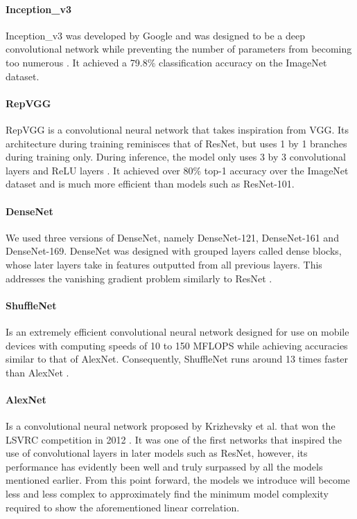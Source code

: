 \documentclass{article}
\begin{document}
\paragraph{Inception\_v3} Inception\_v3 was developed by Google and was designed to be a deep convolutional network while preventing the number of parameters from becoming too numerous \cite{DBLP:journals/corr/SzegedyVISW15}. It achieved a 79.8\% classification accuracy on the ImageNet dataset.

\paragraph{RepVGG} RepVGG is a convolutional neural network that takes inspiration from VGG. Its architecture during training reminisces that of ResNet, but uses 1 by 1 branches during training only. During inference, the model only uses 3 by 3 convolutional layers and ReLU layers \cite{DBLP:journals/corr/abs-2101-03697}. It achieved over 80\% top-1 accuracy over the ImageNet dataset and is much more efficient than models such as ResNet-101.

\paragraph{DenseNet} We used three versions of DenseNet, namely DenseNet-121, DenseNet-161 and DenseNet-169. DenseNet was designed with grouped layers called dense blocks, whose later layers take in features outputted from all previous layers. This addresses the vanishing gradient problem similarly to ResNet \cite{DBLP:journals/corr/HuangLW16a}.

\paragraph{ShuffleNet} Is an extremely efficient convolutional neural network designed for use on mobile devices with computing speeds of 10 to 150 MFLOPS while achieving accuracies similar to that of AlexNet. Consequently, ShuffleNet runs around 13 times faster than AlexNet \cite{DBLP:journals/corr/ZhangZLS17}.

\paragraph{AlexNet} Is a convolutional neural network proposed by Krizhevsky et al. that won the LSVRC competition in 2012 \cite{krizhevsky2017imagenet}. It was one of the first networks that inspired the use of convolutional layers in later models such as ResNet, however, its performance has evidently been well and truly surpassed by all the models mentioned earlier. From this point forward, the models we introduce will become less and less complex to approximately find the minimum model complexity required to show the aforementioned linear correlation.
\end{document}
